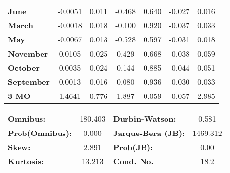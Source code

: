 \begin{center}
\begin{tabular}{lcccccc}
\textbf{June}      &      -0.0051  &        0.011     &    -0.468  &         0.640        &       -0.027    &        0.016     \\
\textbf{March}     &      -0.0018  &        0.018     &    -0.100  &         0.920        &       -0.037    &        0.033     \\
\textbf{May}       &      -0.0067  &        0.013     &    -0.528  &         0.597        &       -0.031    &        0.018     \\
\textbf{November}  &       0.0105  &        0.025     &     0.429  &         0.668        &       -0.038    &        0.059     \\
\textbf{October}   &       0.0035  &        0.024     &     0.144  &         0.885        &       -0.044    &        0.051     \\
\textbf{September} &       0.0013  &        0.016     &     0.080  &         0.936        &       -0.030    &        0.033     \\
\textbf{3 MO}      &       1.4641  &        0.776     &     1.887  &         0.059        &       -0.057    &        2.985     \\
\bottomrule
\end{tabular}
\begin{tabular}{lclc}
\textbf{Omnibus:}       & 180.403 & \textbf{  Durbin-Watson:     } &    0.581  \\
\textbf{Prob(Omnibus):} &   0.000 & \textbf{  Jarque-Bera (JB):  } & 1469.312  \\
\textbf{Skew:}          &   2.891 & \textbf{  Prob(JB):          } &     0.00  \\
\textbf{Kurtosis:}      &  13.213 & \textbf{  Cond. No.          } &     18.2  \\
\bottomrule
\end{tabular}
\end{center}

